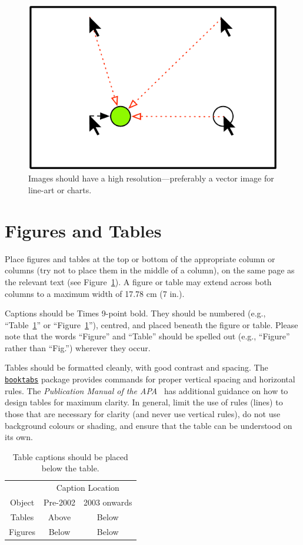 \documentclass[preprint]{../latex/sigchi-modern}
\begin{document}
\begin{figure}
  \centering
  \includegraphics[width=0.9\columnwidth]{figure}
  \caption{Images should have a high resolution---preferably a vector image 
      for line-art or charts.}
  \label{fig:sample}
\end{figure}

\section{Figures and Tables}
Place figures and tables at the top or bottom of the appropriate column or
columns (try not to place them in the middle of a column), on the same page as
the relevant text (see Figure~\ref{fig:sample}). A figure or table may extend
across both columns to a maximum width of 17.78 cm (7 in.).

Captions should be Times 9-point bold. They should be numbered (e.g.,
``Table~\ref{tab:table1}'' or ``Figure~\ref{fig:sample}''), centred, and placed
beneath the figure or table. Please note that the words ``Figure'' and ``Table''
should be spelled out (e.g., ``Figure'' rather than ``Fig.'') wherever they
occur.

Tables should be formatted cleanly, with good contrast and spacing. The
\href{http://ctan.org/pkg/booktabs}{\texttt{booktabs}} package provides commands
for proper vertical spacing and horizontal rules. The
\textit{Publication Manual of the APA}~\cite{apa} has additional guidance on how
to design tables for maximum clarity. In general, limit the use of rules (lines)
to those that are necessary for clarity (and never use vertical rules), do not 
use background colours or shading, and ensure that the table can be understood
on its own.

\begin{table}
  \centering
  \begin{tabular}{ccc}
    \toprule
    & \multicolumn{2}{c}{Caption Location} \\
    \cmidrule(r){2-3}
    Object & Pre-2002 & 2003 onwards \\
    \midrule
    Tables & Above & Below \\
    Figures & Below & Below \\
    \bottomrule
  \end{tabular}
  \caption{Table captions should be placed below the table.}
  \label{tab:table1}
\end{table}
\end{document}
